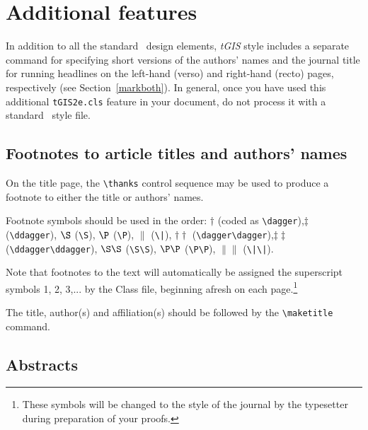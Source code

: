 \documentclass[]{tGIS2e}
\begin{document}
\section{Additional features}

In addition to all the standard \LaTeXe\ design elements, {\it tGIS} style includes a separate command for specifying short versions of the authors' names and the journal title for running headlines on the left-hand (verso) and right-hand (recto) pages, respectively (see Section~\ref{markboth}).  In general, once you have used this additional {\tt tGIS2e.cls} feature in your document, do not process it with a standard \LaTeXe\ style file.

\subsection{Footnotes to article titles and authors' names}

On the title page, the \verb"\thanks" control sequence may be used to produce a footnote to either the title or authors' names.

\vspace{6pt}Footnote symbols should be used in the order: $\dagger$
(coded as \verb"\dagger"),\break $\ddagger$ (\verb"\ddagger"), $\S$ (\verb"\S"),
$\P$ (\verb"\P"), $\|$ (\verb"\|"), $\dagger\dagger$
(\verb"\dagger\dagger"),\break $\ddagger\ddagger$
(\verb"\ddagger\ddagger"),  $\S\S$ (\verb"\S\S"), $\P\P$ (\verb"\P\P"),
$\|\|$ (\verb"\|\|").

Note that footnotes to the text will automatically be assigned the superscript
 symbols 1, 2, 3,... by the Class file, beginning afresh on each
page.\footnote{These symbols will be changed to the style of the journal by the
 typesetter during preparation of your proofs.}

The title, author(s) and affiliation(s) should be followed by the {\verb"\maketitle"} command.

\subsection{Abstracts}
\end{document}
